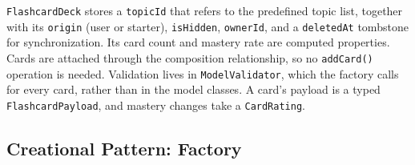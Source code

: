 \documentclass[12pt,letterpaper]{article}
\begin{document}
\texttt{FlashcardDeck} stores a \texttt{topicId} that refers to the predefined topic
list, together with its \texttt{origin} (user or starter), \texttt{isHidden},
\texttt{ownerId}, and a \texttt{deletedAt} tombstone for synchronization. Its card
count and mastery rate are computed properties. Cards are attached through the
composition relationship, so no \texttt{addCard()} operation is needed. Validation
lives in \texttt{ModelValidator}, which the factory calls for every card, rather than
in the model classes. A card's payload is a typed \texttt{FlashcardPayload}, and mastery
changes take a \texttt{CardRating}.

\FloatBarrier
\subsection{Creational Pattern: Factory}\label{sec:factory}
\end{document}
